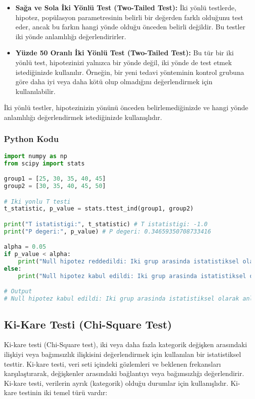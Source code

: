 \begin{itemize}
    \item \textbf{Sağa ve Sola İki Yönlü Test (Two-Tailed Test):} İki yönlü testlerde, hipotez, popülasyon parametresinin belirli bir değerden farklı olduğunu test eder, ancak bu farkın hangi yönde olduğu önceden belirli değildir. Bu testler iki yönde anlamlılığı değerlendirirler.
    \item \textbf{Yüzde 50 Oranlı İki Yönlü Test (Two-Tailed Test):} Bu tür bir iki yönlü test, hipotezinizi yalnızca bir yönde değil, iki yönde de test etmek istediğinizde kullanılır. Örneğin, bir yeni tedavi yönteminin kontrol grubuna göre daha iyi veya daha kötü olup olmadığını değerlendirmek için kullanılabilir.
\end{itemize}

İki yönlü testler, hipotezinizin yönünü önceden belirlemediğinizde ve hangi yönde anlamlılığı değerlendirmek istediğinizde kullanışlıdır.

\subsubsection{Python Kodu}

\begin{lstlisting}[language=Python]
import numpy as np
from scipy import stats

group1 = [25, 30, 35, 40, 45]
group2 = [30, 35, 40, 45, 50]

# Iki yonlu T testi
t_statistic, p_value = stats.ttest_ind(group1, group2)

print("T istatistigi:", t_statistic) # T istatistigi: -1.0
print("P degeri:", p_value) # P degeri: 0.34659350708733416

alpha = 0.05
if p_value < alpha:
    print("Null hipotez reddedildi: Iki grup arasinda istatistiksel olarak anlamli bir fark vardir.")
else:
    print("Null hipotez kabul edildi: Iki grup arasinda istatistiksel olarak anlamli bir fark yoktur.")

# Output
# Null hipotez kabul edildi: Iki grup arasinda istatistiksel olarak anlamli bir fark yoktur.
\end{lstlisting}

\newpage

\subsection{Ki-Kare Testi (Chi-Square Test)}
Ki-kare testi (Chi-Square test), iki veya daha fazla kategorik değişken arasındaki ilişkiyi veya bağımsızlık ilişkisini değerlendirmek için kullanılan bir istatistiksel testtir. Ki-kare testi, veri seti içindeki gözlemleri ve beklenen frekansları karşılaştırarak, değişkenler arasındaki bağlantıyı veya bağımsızlığı değerlendirir. Ki-kare testi, verilerin ayrık (kategorik) olduğu durumlar için kullanışlıdır. Ki-kare testinin iki temel türü vardır:

